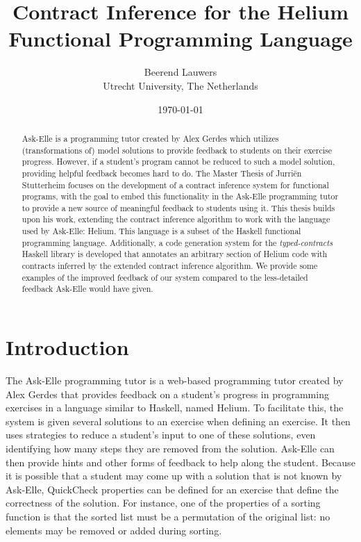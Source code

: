 \documentclass[10pt]{report}
\author{
	Beerend Lauwers\\
	Utrecht University, The Netherlands}
\date{\today}
\title{Contract Inference for the Helium Functional Programming Language}
\begin{document}
\maketitle


\begin{abstract}
Ask-Elle is a programming tutor created by Alex Gerdes \cite{Gerdes:2012:phd} which utilizes (transformations of) model solutions to provide feedback to students on their exercise progress.
However, if a student's program cannot be reduced to such a model solution, providing helpful feedback becomes hard to do. 
The Master Thesis of Jurri\"en Stutterheim \cite{Stutterheim:2013:thesis} focuses on the development of a contract inference system for functional programs, with the goal to embed this functionality in the Ask-Elle programming tutor to provide a new source of meaningful feedback to students using it.
This thesis builds upon his work, extending the contract inference algorithm to work with the language used by Ask-Elle: Helium.
This language is a subset of the Haskell functional programming language.
Additionally, a code generation system  for the \textit{typed-contracts} Haskell library is developed that annotates an arbitrary section of Helium code with contracts inferred by the extended contract inference algorithm.
We provide some examples of the improved feedback of our system compared to the less-detailed feedback Ask-Elle would have given.
\end{abstract}

\tableofcontents

\chapter{Introduction}

The Ask-Elle programming tutor is a web-based programming tutor created by Alex Gerdes \cite{Gerdes:2012:phd} that provides feedback on a student's progress in programming exercises in a language similar to Haskell, named Helium.
To facilitate this, the system is given several solutions to an exercise when defining an exercise.
It then uses strategies to reduce a student's input to one of these solutions, even identifying how many steps they are removed from the solution.
Ask-Elle can then provide hints and other forms of feedback to help along the student.
Because it is possible that a student may come up with a solution that is not known by Ask-Elle, QuickCheck \cite{Claessen:2000p592} properties can be defined for an exercise that define the correctness of the solution.
For instance, one of the properties of a sorting function is that the sorted list must be a permutation of the original list: no elements may be removed or added during sorting.
\end{document}
